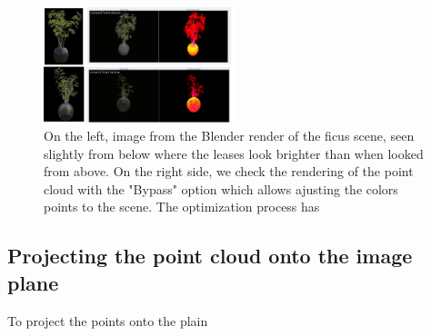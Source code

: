 \begin{figure}[H]
    \centering
    \includegraphics[width=0.5\textwidth]{figures/ficus_culling_issue_3.png}
    \caption{On the left, image from the Blender render of the ficus scene, seen slightly from below where the leases look brighter than when looked from above. On the right side, we check the rendering of the point cloud with the "Bypass" option which allows ajusting the colors points to the scene. The optimization process has }
    \label{fig:ficus_culling_issue}
\end{figure}

\subsection{Projecting the point cloud onto the image plane}
\label{sec:projecting_the_point_cloud_onto_the_image_plane}
To project the points onto the plain